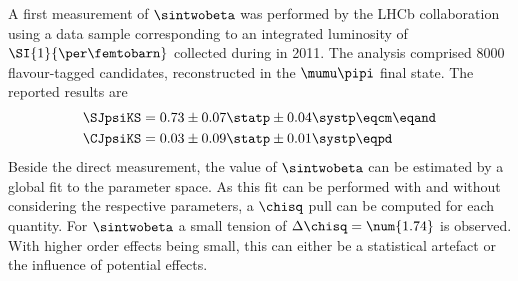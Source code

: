 %
A first measurement of $\sintwobeta$ was performed by the \acs*{LHCb}
collaboration using a data sample corresponding to an integrated luminosity of
$\SI{1}{\per\femtobarn}$ collected during \RunOne in 2011. The analysis
comprised $\num{8000}$ flavour-tagged \BdToJpsiKS candidates, reconstructed in
the $\mumu\pipi$ final state. The reported results \cite{Aaij:1497268} are
%
\begin{equation*}
  \begin{split}
    \SJpsiKS &= 0.73 \pm 0.07 \statp \pm 0.04 \systp \eqcm\eqand \\
    \CJpsiKS &= 0.03 \pm 0.09 \statp \pm 0.01 \systp \eqpd
  \end{split}
\end{equation*}
%
Beside the direct measurement, the value of $\sintwobeta$ can be estimated by a
global fit to the \CKM parameter space. As this fit can be performed with and
without considering the respective parameters, a $\chisq$ pull can be computed
for each quantity. For $\sintwobeta$ a small tension of $\Delta\chisq =
\num{1.74}$ is observed. With higher order effects being small, this can either
be a statistical artefact or the influence of potential \BSM effects.
